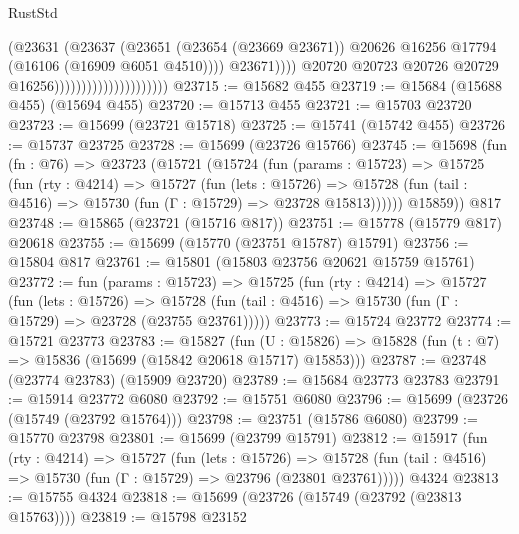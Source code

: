 \begin{lexlean}{RustStd}
\begin{coremodule}
                                                    (@23631
                                                      (@23637
                                                        (@23651
                                                          (@23654 (@23669 @23671))
                                                          @20626
                                                          @16256
                                                          @17794
                                                          (@16106 (@16909 @6051 @4510))))
                                                      @23671))))
                                              @20720
                                              @20723
                                              @20726
                                              @20729
                                              @16256)))))))))))))))))))))
@23715 := @15682 @455
@23719 := @15684 (@15688 @455) (@15694 @455)
@23720 := @15713 @455
@23721 := @15703 @23720
@23723 := @15699 (@23721 @15718)
@23725 := @15741 (@15742 @455)
@23726 := @15737 @23725
@23728 := @15699 (@23726 @15766)
@23745 := @15698
    (fun (fn : @76) =>
    @23723
      (@15721
        (@15724
          (fun (params : @15723) =>
          @15725
            (fun (rty : @4214) =>
            @15727
              (fun (lets : @15726) =>
              @15728 (fun (tail : @4516) => @15730 (fun (Γ : @15729) => @23728 @15813))))))
        @15859))
    @817
@23748 := @15865 (@23721 (@15716 @817))
@23751 := @15778 (@15779 @817) @20618
@23755 := @15699 (@15770 (@23751 @15787) @15791)
@23756 := @15804 @817
@23761 := @15801 (@15803 @23756 @20621 @15759 @15761)
@23772 := fun (params : @15723) =>
  @15725
    (fun (rty : @4214) =>
    @15727
      (fun (lets : @15726) =>
      @15728 (fun (tail : @4516) => @15730 (fun (Γ : @15729) => @23728 (@23755 @23761)))))
@23773 := @15724 @23772
@23774 := @15721 @23773
@23783 := @15827
    (fun (U : @15826) => @15828 (fun (t : @7) => @15836 (@15699 (@15842 @20618 @15717) @15853)))
@23787 := @23748 (@23774 @23783) (@15909 @23720)
@23789 := @15684 @23773 @23783
@23791 := @15914 @23772 @6080
@23792 := @15751 @6080
@23796 := @15699 (@23726 (@15749 (@23792 @15764)))
@23798 := @23751 (@15786 @6080)
@23799 := @15770 @23798
@23801 := @15699 (@23799 @15791)
@23812 := @15917
    (fun (rty : @4214) =>
    @15727
      (fun (lets : @15726) =>
      @15728 (fun (tail : @4516) => @15730 (fun (Γ : @15729) => @23796 (@23801 @23761)))))
    @4324
@23813 := @15755 @4324
@23818 := @15699 (@23726 (@15749 (@23792 (@23813 @15763))))
@23819 := @15798 @23152

\end{coremodule}
\end{lexlean}
